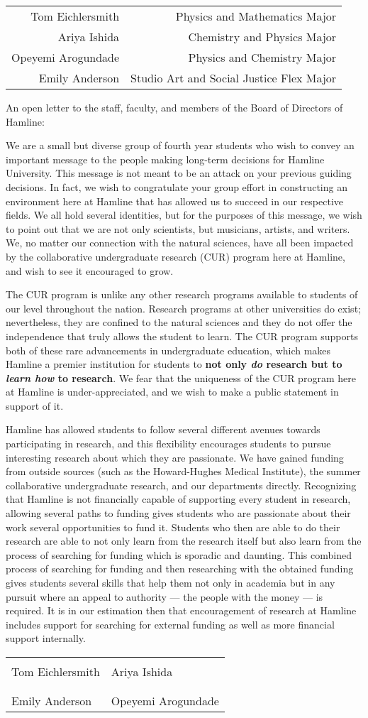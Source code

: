 \documentclass{article}
\makeatletter
\newcommand{\signers}{
	\begin{table}[h]
	\raggedleft
	\begin{tabular}{rr}
		Tom Eichlersmith & Physics and Mathematics Major \\
		Ariya Ishida & Chemistry and Physics Major \\
		Opeyemi Arogundade & Physics and Chemistry Major \\
		Emily Anderson & Studio Art and Social Justice Flex Major
	\end{tabular}
	\end{table}
}
\newcommand{\opening}{
	\vskip 5mm
	\noindent
	An open letter to the staff, faculty, and members of the Board of Directors of Hamline:
	\vskip 5mm
}
\newcommand{\signatures}{
	\vskip 5mm
	\begin{table}
	\begin{tabular}{@{}p{0.5\textwidth}p{0.5\textwidth}@{}}
		\hrulefill & \hrulefill \\
		Tom Eichlersmith & Ariya Ishida \\
		& \\
		\hrulefill & \hrulefill \\
		Emily Anderson & Opeyemi Arogundade  \\
	\end{tabular}
	\end{table}
}
\makeatother
\begin{document}
\onehalfspacing

\signers

\opening

We are a small but diverse group of fourth year students who wish to convey an important message to the people making long-term decisions for Hamline University.
This message is not meant to be an attack on your previous guiding decisions.
In fact, we wish to congratulate your group effort in constructing an environment here at Hamline that has allowed us to succeed in our respective fields.
We all hold several identities, but for the purposes of this message, we wish to point out that we are not only scientists, but musicians, artists, and writers.
We, no matter our connection with the natural sciences, have all been impacted by the collaborative undergraduate research (CUR) program here at Hamline, and wish to see it encouraged to grow.

The CUR program is unlike any other research programs available to students of our level throughout the nation.
Research programs at other universities do exist; nevertheless, they are confined to the natural sciences and they do not offer the independence that truly allows the student to learn.
The CUR program supports both of these rare advancements in undergraduate education, which makes Hamline a premier institution for students to \textbf{not only \emph{do} research but to \emph{learn how} to research}.
We fear that the uniqueness of the CUR program here at Hamline is under-appreciated, and we wish to make a public statement in support of it.

Hamline has allowed students to follow several different avenues towards participating in research, and this flexibility encourages students to pursue interesting research about which they are passionate.
We have gained funding from outside sources (such as the Howard-Hughes Medical Institute), the summer collaborative undergraduate research, and our departments directly.
Recognizing that Hamline is not financially capable of supporting every student in research, allowing several paths to funding gives students who are passionate about their work several opportunities to fund it.
Students who then are able to do their research are able to not only learn from the research itself but also learn from the process of searching for funding which is sporadic and daunting.
This combined process of searching for funding and then researching with the obtained funding gives students several skills that help them not only in academia but in any pursuit where an appeal to authority --- the people with the money --- is required.
It is in our estimation then that encouragement of research at Hamline includes support for searching for external funding as well as more financial support internally.


\signatures
\end{document}
